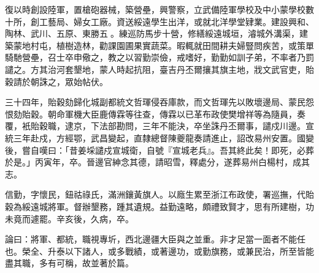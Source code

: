 \begin{pinyinscope}
復以時創設陸軍，置槍砲器械，築營壘，興警察，立武備陸軍學校及中小蒙學校數十所，創工藝局、婦女工廠。資送綏遠學生出洋，或就北洋學堂肄業。建設興和、陶林、武川、五原、東勝五。練巡防馬步十營，修繕綏遠城垣，濬城外溝渠，建築蒙地村屯，植樹造林，勸課園圃果實蔬菜。暇輒就田間耕夫婦豎問疾苦，或策單騎馳營壘，召士卒申儆之，教之以習勤崇儉，戒嗜好，勤勤如訓子弟，不率者乃罰譴之。方其治河套墾地，蒙人時起抗阻，臺吉丹丕爾攘其旗主地，戕文武官吏，貽穀請於朝誅之，眾始帖伏。

三十四年，貽穀劾歸化城副都統文哲琿侵吞庫款，而文哲琿先以敗壞邊局、蒙民怨恨劾貽穀。朝命軍機大臣鹿傳霖等往查，傳霖以已革布政使樊增祥等為隨員，奏覆，衹貽穀職，逮京，下法部勘問，三年不能決，卒坐誅丹丕爾事，譴戍川邊。宣統三年赴戍，方經鄂，武昌變起，直隸總督陳夔龍奏請進止，詔改易州安置。國變後，嘗自嘆曰：「昔姜埰譴戍宣城衛，自號『宣城老兵』。吾其終此矣！即死，必葬於是。」丙寅年，卒。晉邊官紳念其德，請昭雪，釋處分，遂葬易州白楊村，成其志。

信勤，字懷民，鈕祜祿氏，滿洲鑲黃旗人。以廕生累至浙江布政使，署巡撫，代貽穀為綏遠城將軍。督辦墾務，踵其遺規。益勤遠略，頗禮致賢才，思有所建樹，功未竟而遽罷。辛亥後，久病，卒。

論曰：將軍、都統，職視專圻，西北邊疆大臣與之並重。非才足當一面者不能任也。榮全、升泰以下諸人，或多戰績，或著邊功，或勤旗務，或兼民治，所至皆能盡其職，多有可稱，故並著於篇。


\end{pinyinscope}